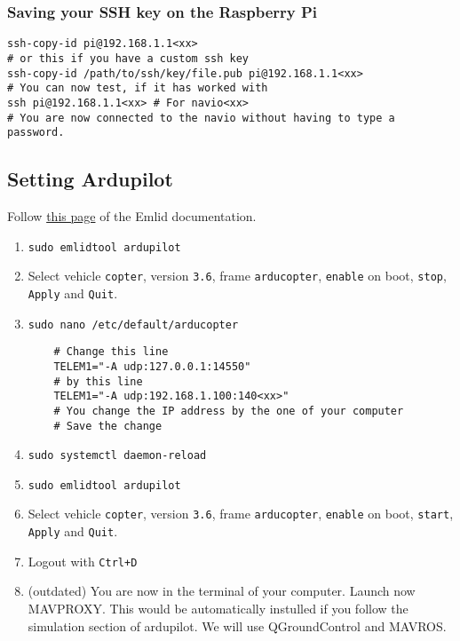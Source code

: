             \subsubsection{Saving your SSH key on the Raspberry Pi}
                
                \begin{verbatim}
ssh-copy-id pi@192.168.1.1<xx>
# or this if you have a custom ssh key
ssh-copy-id /path/to/ssh/key/file.pub pi@192.168.1.1<xx>
# You can now test, if it has worked with
ssh pi@192.168.1.1<xx> # For navio<xx>
# You are now connected to the navio without having to type a password.
                \end{verbatim}
    
        \subsection{Setting Ardupilot}
            Follow \href{https://docs.emlid.com/navio2/common/ardupilot/installation-and-running/}{this page} of the Emlid documentation.
                
            \begin{enumerate}
                \item \texttt{sudo emlidtool ardupilot}
                \item Select vehicle \texttt{copter}, version \texttt{3.6}, frame \texttt{arducopter}, \texttt{enable} on boot, \texttt{stop}, \texttt{Apply} and \texttt{Quit}.
                \item \texttt{sudo nano /etc/default/arducopter}
          
            
                \begin{verbatim}
    # Change this line
    TELEM1="-A udp:127.0.0.1:14550"
    # by this line
    TELEM1="-A udp:192.168.1.100:140<xx>"
    # You change the IP address by the one of your computer
    # Save the change
                \end{verbatim}
                                
           
                \item \texttt{sudo systemctl daemon-reload}
                \item \texttt{sudo emlidtool ardupilot}
                \item Select vehicle \texttt{copter}, version \texttt{3.6}, frame \texttt{arducopter}, \texttt{enable} on boot, \texttt{start}, \texttt{Apply} and \texttt{Quit}.
                \item Logout with \texttt{Ctrl+D}
                \item (outdated) You are now in the terminal of your computer. Launch now MAVPROXY. This would be automatically instulled if you follow the simulation section of ardupilot. We will use QGroundControl and MAVROS.
            \end{enumerate}
            
